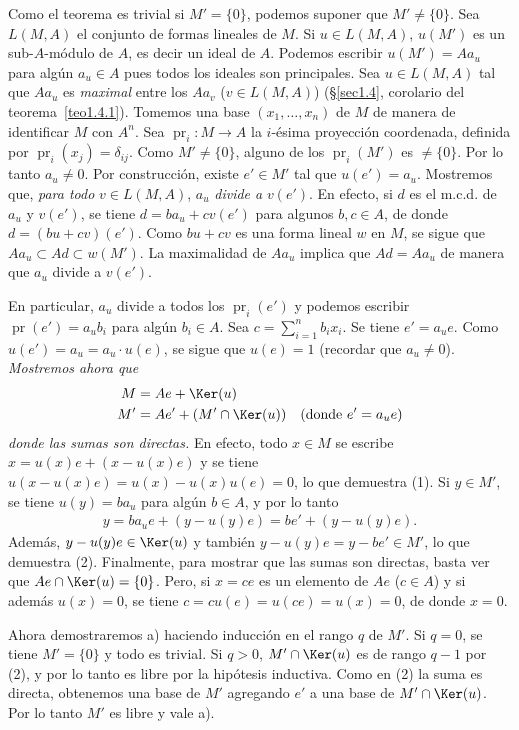 \documentclass[bibtotoc,leqno,spanish]{amsbook}
\renewcommand{\to}[1][]{\xrightarrow{#1}}
\DeclareMathOperator{\pr}{pr}
\numberwithin{equation}{section}
\theoremstyle{note}
\theoremstyle{note}
\theoremstyle{rem}
\numberwithin{theorem}{section}
\numberwithin{proposition}{section}
\numberwithin{definition}{section}
\numberwithin{lemma}{section}
\numberwithin{corollary}{section}
\numberwithin{example}{section}
\numberwithin{footnote}{section}%
\begin{document}
Como el teorema es trivial si $M' = \{0\}$, podemos suponer que $M' \neq \{0\}$.
Sea $L(M,A)$ el conjunto de formas lineales de $M$. Si $u\in L(M,A)$, $u(M')$
es un sub-$A$-m\'odulo de $A$, es decir un ideal de $A$. Podemos escribir $u(M') = Aa_{u}$
para alg\'un $a_{u}\in A$ pues todos los ideales son principales. Sea $u\in L(M,A)$
tal que $Aa_{u}$ es {\em maximal} entre los $Aa_{v}$ ($v\in L(M,A)$) (\S\ref{sec1.4},
corolario del teorema~\ref{teo1.4.1}).
Tomemos una base $(x_{1},\dots,x_{n})$ de $M$ de manera de identificar
$M$ con $A^{n}$. Sea $\pr_{i}:M\to A$ la $i$-\'esima proyecci\'on coordenada, definida
por $\pr_{i}(x_{j}) = \delta_{ij}$. Como $M'\neq\{0\}$, alguno de los $\pr_{i}(M')$ es
$\neq\{0\}$. Por lo tanto $a_{u}\neq 0$. Por construcci\'on, existe $e'\in M'$ tal que
$u(e') = a_{u}$. Mostremos que, {\em para todo} $v\in L(M,A)$, $a_{u}$ {\em divide a} $v(e')$.
En efecto, si $d$ es el m.c.d. de $a_{u}$ y $v(e')$, se tiene $d = ba_{u}+cv(e')$ para
algunos $b,c\in A$, de donde $d = (bu+cv)(e')$. Como $bu+cv$ es una forma lineal $w$ en $M$,
se sigue que $Aa_{u}\subset Ad\subset w(M')$. La maximalidad de $Aa_{u}$ implica que
$Ad = Aa_{u}$ de manera que $a_{u}$ divide a $v(e')$.

En particular, $a_{u}$ divide a todos los $\pr_{i}(e')$ y podemos escribir $\pr(e') = a_{u}b_{i}$
para alg\'un
$b_{i}\in A$. Sea $c = \sum_{i=1}^{n}b_{i}x_{i}$. Se tiene $e' = a_{u}e$. Como
$u(e') = a_{u} = a_{u}\cdot u(e)$, se sigue que $u(e) = 1$ (recordar que $a_{u}\neq 0$).
{\itshape Mostremos ahora que
\begin{align}
M &= Ae+\Ker(u)\\
M' &= Ae'+(M'\cap \Ker(u))\quad(\text{donde $e' = a_{u}e$})
\end{align}
donde las sumas son directas.} En efecto, todo $x\in M$ se escribe $x = u(x)e+(x-u(x)e)$
y se tiene $u(x-u(x)e) = u(x) - u(x)u(e) = 0$, lo que demuestra (1). Si $y\in M'$, se
tiene $u(y) = ba_{u}$ para alg\'un $b\in A$, y por lo tanto
\begin{gather*}
y = ba_{u}e + (y-u(y)e) = be'+(y-u(y)e).
\end{gather*}
Adem\'as, $y-u(y)e\in\Ker(u)$ y tambi\'en $y-u(y)e = y-be'\in M'$, lo que demuestra (2).
Finalmente, para mostrar que las sumas son directas, basta ver que $Ae\cap\Ker(u) = \{0\}$.
Pero, si $x = ce$ es un elemento de $Ae$ ($c\in A$) y si adem\'as $u(x) = 0$, se tiene $c = cu(e) = u(ce)
= u(x) = 0$, de donde $x = 0$.

Ahora demostraremos a) haciendo inducci\'on en el rango $q$ de $M'$. Si $q = 0$, se tiene
$M' = \{0\}$ y todo es trivial. Si $q > 0$, $M'\cap\Ker(u)$ es de rango $q-1$ por (2), y por lo
tanto es libre por la hip\'otesis inductiva. Como en (2) la suma es directa, obtenemos una
base de $M'$ agregando $e'$ a una base de $M'\cap\Ker(u)$. Por lo tanto $M'$ es libre y vale a).
\end{document}

